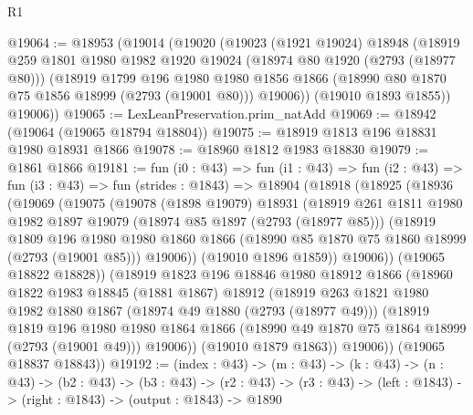 \begin{lexlean}{R1}
\begin{coremodule}
@19064 := @18953
    (@19014
      (@19020
        (@19023
          (@1921 @19024)
          @18948
          (@18919
            @259
            @1801
            @1980
            @1982
            @1920
            @19024
            (@18974 @80 @1920 (@2793 (@18977 @80)))
            (@18919
              @1799
              @196
              @1980
              @1980
              @1856
              @1866
              (@18990 @80 @1870 @75 @1856 @18999 (@2793 (@19001 @80)))
              @19006))
          (@19010 @1893 @1855))
        @19006))
@19065 := LexLeanPreservation.prim_natAdd
@19069 := @18942 (@19064 (@19065 @18794 @18804))
@19075 := @18919 @1813 @196 @18831 @1980 @18931 @1866
@19078 := @18960 @1812 @1983 @18830
@19079 := @1861 @1866
@19181 := fun (i0 : @43) =>
  fun (i1 : @43) =>
  fun (i2 : @43) =>
  fun (i3 : @43) =>
  fun (strides : @1843) =>
  @18904
    (@18918
      (@18925
        (@18936
          (@19069
            (@19075
              (@19078
                (@1898 @19079)
                @18931
                (@18919
                  @261
                  @1811
                  @1980
                  @1982
                  @1897
                  @19079
                  (@18974 @85 @1897 (@2793 (@18977 @85)))
                  (@18919
                    @1809
                    @196
                    @1980
                    @1980
                    @1860
                    @1866
                    (@18990 @85 @1870 @75 @1860 @18999 (@2793 (@19001 @85)))
                    @19006))
                (@19010 @1896 @1859))
              @19006))
          (@19065 @18822 @18828))
        (@18919
          @1823
          @196
          @18846
          @1980
          @18912
          @1866
          (@18960
            @1822
            @1983
            @18845
            (@1881 @1867)
            @18912
            (@18919
              @263
              @1821
              @1980
              @1982
              @1880
              @1867
              (@18974 @49 @1880 (@2793 (@18977 @49)))
              (@18919
                @1819
                @196
                @1980
                @1980
                @1864
                @1866
                (@18990 @49 @1870 @75 @1864 @18999 (@2793 (@19001 @49)))
                @19006))
            (@19010 @1879 @1863))
          @19006))
      (@19065 @18837 @18843))
@19192 := (index : @43) ->
  (m : @43) ->
  (k : @43) ->
  (n : @43) ->
  (b2 : @43) ->
  (b3 : @43) ->
  (r2 : @43) -> (r3 : @43) -> (left : @1843) -> (right : @1843) -> (output : @1843) -> @1890

\end{coremodule}
\end{lexlean}
